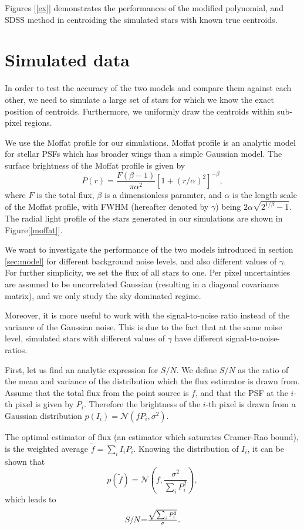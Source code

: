 \documentclass[12pt, preprint]{aastex}
\newcommand{\beq}{\begin{equation}}
\newcommand{\eeq}{\end{equation}}
\begin{document}
Figures [\ref{ex}] demonstrates the performances of the modified polynomial, and SDSS method in centroiding the simulated stars with known true centroids.

\section{Simulated data}\label{sec:data}

In order to test the accuracy of the two models and compare them against each other, we need to simulate a large set of stars for which we know the exact position of centroids. Furthermore, we uniformly draw the centroids within sub-pixel regions. 

We use the Moffat profile \citep{moffat} for our simulations. Moffat profile is an analytic model for stellar PSFs which has broader wings than a simple Gaussian model. The surface brightness of the Moffat profile is given by
\beq
P(r) = \frac{F(\beta -1)}{\pi \alpha^{2}}[1+(r/\alpha)^{2}]^{-\beta},
\label{mof}
\eeq
where $F$ is the total flux, $\beta$ is a dimensionless paramter, and $\alpha$ is the length scale of the Moffat profile, with FWHM (hereafter denoted by $\gamma$) being $2\alpha\sqrt{2^{1/\beta}-1}$. The radial light profile of the stars generated in our simulations are shown in Figure[\ref{moffat}].

We want to investigate the performance of the two models introduced in section \ref{sec:model} for different background noise levels, and also different values of $\gamma$. For further simplicity, we set the flux of all stars to one. Per pixel uncertainties are assumed to be uncorrelated Gaussian (resulting in a diagonal covariance matrix), and we only study the sky dominated regime.

Moreover, it is more useful to work with the signal-to-noise ratio instead of the variance of the Gaussian noise. This is due to the fact that at the same noise level, simulated stars with different values of $\gamma$ have different signal-to-noise-ratios. 

First, let us find an analytic expression for $S/N$. We define $S/N$ as the ratio of the mean and variance of the distribution which the flux estimator is drawn from. Assume that the total flux from the point source is $f$, and that the PSF at the $i$-th pixel is given by $P_{i}$. Therefore the brightness of the $i$-th pixel is drawn from a Gaussian distribution $p(I_{i}) = \mathcal{N}(fP_{i},\sigma^{2})$. 

The optimal estimator of flux (an estimator which saturates Cramer-Rao bound), is the weighted average $\tilde{f}=\sum_{i}I_{i}P_{i}$. Knowing the distribution of $I_{i}$, it can be shown that 
\beq
p(\tilde{f}) = \mathcal{N}(f , \frac{\sigma^{2}}{\sum_{i}P_{i}^{2}}),
\eeq  
which leads to
\beq
\begin{array}{l}
S/N $=$ \frac{\sqrt{\sum_{i} P_{i}^{2}}}{\sigma}.
\end{array}
\label{snr}
\eeq
\end{document}
